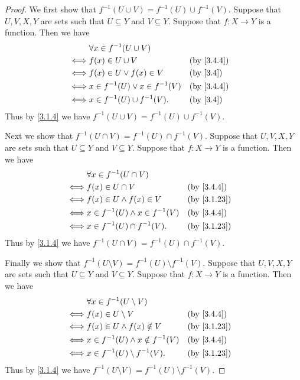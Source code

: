 \begin{proof}
  We first show that \(f^{-1}(U \cup V) = f^{-1}(U) \cup f^{-1}(V)\).
  Suppose that \(U, V, X, Y\) are sets such that \(U \subseteq Y\) and \(V \subseteq Y\).
  Suppose that \(f : X \to Y\) is a function.
  Then we have
  \begin{align*}
         & \forall x \in f^{-1}(U \cup V)                                     \\
    \iff & f(x) \in U \cup V                    &  & \text{(by \cref{3.4.4})} \\
    \iff & f(x) \in U \lor f(x) \in V           &  & \text{(by \cref{3.4})}   \\
    \iff & x \in f^{-1}(U) \lor x \in f^{-1}(V) &  & \text{(by \cref{3.4.4})} \\
    \iff & x \in f^{-1}(U) \cup f^{-1}(V).      &  & \text{(by \cref{3.4})}
  \end{align*}
  Thus by \cref{3.1.4} we have \(f^{-1}(U \cup V) = f^{-1}(U) \cup f^{-1}(V)\).

  Next we show that \(f^{-1}(U \cap V) = f^{-1}(U) \cap f^{-1}(V)\).
  Suppose that \(U, V, X, Y\) are sets such that \(U \subseteq Y\) and \(V \subseteq Y\).
  Suppose that \(f : X \to Y\) is a function.
  Then we have
  \begin{align*}
         & \forall x \in f^{-1}(U \cap V)                                       \\
    \iff & f(x) \in U \cap V                     &  & \text{(by \cref{3.4.4})}  \\
    \iff & f(x) \in U \land f(x) \in V           &  & \text{(by \cref{3.1.23})} \\
    \iff & x \in f^{-1}(U) \land x \in f^{-1}(V) &  & \text{(by \cref{3.4.4})}  \\
    \iff & x \in f^{-1}(U) \cap f^{-1}(V).       &  & \text{(by \cref{3.1.23})}
  \end{align*}
  Thus by \cref{3.1.4} we have \(f^{-1}(U \cap V) = f^{-1}(U) \cap f^{-1}(V)\).

  Finally we show that \(f^{-1}(U \setminus V) = f^{-1}(U) \setminus f^{-1}(V)\).
  Suppose that \(U, V, X, Y\) are sets such that \(U \subseteq Y\) and \(V \subseteq Y\).
  Suppose that \(f : X \to Y\) is a function.
  Then we have
  \begin{align*}
         & \forall x \in f^{-1}(U \setminus V)                                     \\
    \iff & f(x) \in U \setminus V                   &  & \text{(by \cref{3.4.4})}  \\
    \iff & f(x) \in U \land f(x) \notin V           &  & \text{(by \cref{3.1.23})} \\
    \iff & x \in f^{-1}(U) \land x \notin f^{-1}(V) &  & \text{(by \cref{3.4.4})}  \\
    \iff & x \in f^{-1}(U) \setminus f^{-1}(V).     &  & \text{(by \cref{3.1.23})}
  \end{align*}
  Thus by \cref{3.1.4} we have \(f^{-1}(U \setminus V) = f^{-1}(U) \setminus f^{-1}(V)\).
\end{proof}

